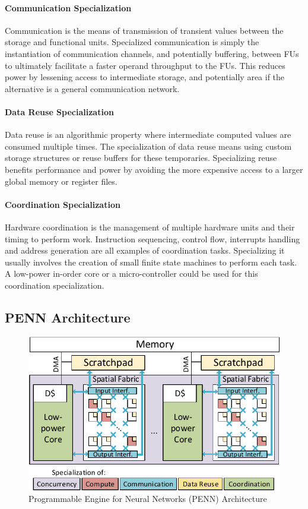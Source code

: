 \paragraph{Communication Specialization} 
Communication is the means of transmission of transient
values between the storage and functional units.  Specialized
communication is simply the instantiation of communication channels, and
potentially buffering, between FUs to ultimately facilitate a faster
operand throughput to the FUs.  This reduces power by lessening access
to intermediate storage, and potentially area if the alternative is a general
communication network.  

\paragraph{Data Reuse Specialization} 
Data reuse is an algorithmic property where intermediate
computed values are consumed multiple times.  
The specialization of data reuse means using
custom storage structures or reuse buffers for these temporaries.
Specializing reuse benefits performance and power by avoiding 
the more expensive access to a larger global memory or register files.

\paragraph{Coordination Specialization} 
Hardware coordination is the management of multiple hardware
units and their timing to perform  work.  Instruction
sequencing, control flow, interrupts handling and address generation are all
examples of coordination tasks.  
Specializing it usually involves the
creation of small finite state machines to perform each task.
A low-power in-order core or a micro-controller could be used for this coordination specialization.

\subsection{PENN Architecture}

\begin{figure}
  \includegraphics[width=\linewidth]{figs/fabric_5p.pdf}
  \vspace{-0.1in}
  \caption{Programmable Engine for Neural Networks (PENN) Architecture \textnormal{\small }  }
  \label{fig:penn-fabric}
\end{figure}

